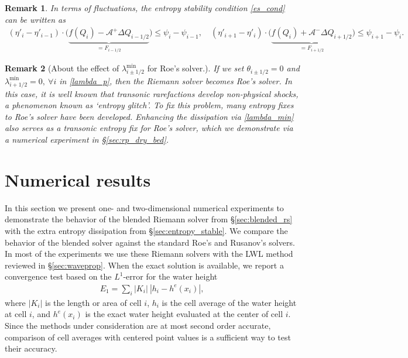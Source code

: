 \documentclass[preprint, 11pt]{article}
\newcommand{\A}{{\mathcal A}}
\newcommand{\iph}{{i+1/2}}
\newcommand{\bff}{{f}}
\newcommand{\bfF}{{F}}
\newcommand{\entvar}{\eta'}
\newcommand{\bfq}{{Q}}
\newcommand{\bfx}{{x}}
\newcommand{\efp}{\psi}
\newtheorem{remark}{Remark}
\begin{document}
\begin{remark}
In terms of fluctuations, the entropy stability condition \eqref{es_cond} can be written as
\begin{align*}
  (\entvar_{i}-\entvar_{i-1})\cdot
  \Big(
  \underbrace{\bff(\bfq_i)-\A^+\Delta Q_{i-1/2}}_{=\bfF_{i-1/2}}\Big)\leq \efp_{i}-\efp_{i-1},
  \quad
  (\entvar_{i+1}-\entvar_i)\cdot
  \Big(\underbrace{\bff(\bfq_i)+\A^-\Delta Q_{i+1/2}}_{=\bfF_{i+1/2}}\Big)\leq \efp_{i+1}-\efp_i.
\end{align*}
\end{remark}

\begin{remark}[About the effect of $\lambda_{i\pm 1/2}^{\min}$ for Roe's solver.]
  If we set $\theta_{i\pm 1/2}=0$ and $\lambda^{\min}_\iph=0, ~\forall i$ in \eqref{lambda_p}, then the Riemann solver becomes Roe's solver.
  In this case, it is well known that transonic rarefactions develop non-physical shocks,
  a phenomenon known as `entropy glitch'. To fix this problem, many entropy fixes to Roe's
  solver have been developed. Enhancing the dissipation via \eqref{lambda_min}
  also serves as a transonic entropy fix for Roe's solver, which we demonstrate
  via a numerical experiment in \S \ref{sec:rp_dry_bed}.
\end{remark}

\clearpage
\section{Numerical results}\label{sec:num}
In this section we present one- and two-dimensional numerical experiments to demonstrate the behavior of the
blended Riemann solver from \S\ref{sec:blended_rs} with the extra entropy dissipation from \S\ref{sec:entropy_stable}.
We compare the behavior of the blended solver against the standard Roe's and Rusanov's solvers.
In most of the experiments we use these Riemann solvers with the LWL method reviewed in \S\ref{sec:waveprop}.
When the exact solution is available, we report a convergence test based on the $L^1$-error for the water height
\begin{align*}
  E_1=\sum_i|K_i|~|h_i-h^e(\bfx_i)|,
\end{align*}
where $|K_i|$ is the length or area of cell $i$,
$h_i$ is the cell average of the water height at cell $i$,
and $h^e(\bfx_i)$ is the exact water height evaluated at the center of cell $i$.
Since the methods under consideration are at most second order accurate, comparison
of cell averages with centered point values is a sufficient way to test their accuracy.
\end{document}
